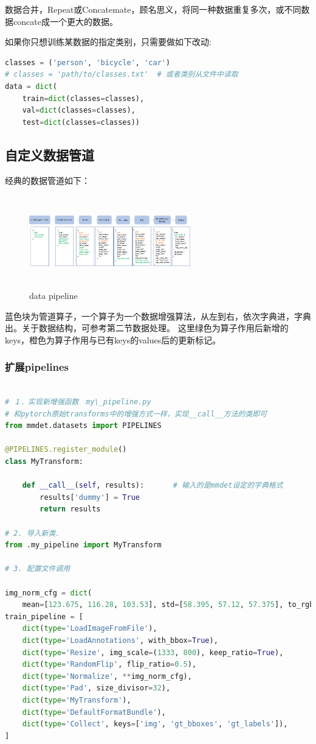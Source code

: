\documentclass[UTF8]{ctexart}
\begin{document}
数据合并，Repeat或Concatemate，顾名思义，将同一种数据重复多次，或不同数据concate成一个更大的数据。

如果你只想训练某数据的指定类别，只需要做如下改动:

\lstset{style=mystyle}
\begin{lstlisting}[language=Python]
classes = ('person', 'bicycle', 'car')
# classes = 'path/to/classes.txt'  # 或者类别从文件中读取
data = dict(
	train=dict(classes=classes),
	val=dict(classes=classes),
	test=dict(classes=classes))
\end{lstlisting}


\subsection{自定义数据管道}

经典的数据管道如下：
\begin{figure}[htbp]
	\centering
	\includegraphics[width=7cm, height=4cm]{./pic/data_pipeline.png}
	\caption{ data pipeline }
\end{figure}

蓝色块为管道算子，一个算子为一个数据增强算法，从左到右，依次字典进，字典出。关于数据结构，可参考第二节数据处理。
这里绿色为算子作用后新增的keys，橙色为算子作用与已有keys的values后的更新标记。


\subsubsection{扩展pipelines}

\lstset{style=mystyle}
\begin{lstlisting}[language=Python]

# １．实现新增强函数　my\_pipeline.py
# 和pytorch原始transforms中的增强方式一样，实现__call__方法的类即可
from mmdet.datasets import PIPELINES

@PIPELINES.register_module()
class MyTransform:

    def __call__(self, results):　　　　# 输入的是mmdet设定的字典格式
        results['dummy'] = True
		return results
		
# 2. 导入新类.
from .my_pipeline import MyTransform

# 3. 配置文件调用

img_norm_cfg = dict(
    mean=[123.675, 116.28, 103.53], std=[58.395, 57.12, 57.375], to_rgb=True)
train_pipeline = [
    dict(type='LoadImageFromFile'),
    dict(type='LoadAnnotations', with_bbox=True),
    dict(type='Resize', img_scale=(1333, 800), keep_ratio=True),
    dict(type='RandomFlip', flip_ratio=0.5),
    dict(type='Normalize', **img_norm_cfg),
    dict(type='Pad', size_divisor=32),
    dict(type='MyTransform'),
    dict(type='DefaultFormatBundle'),
    dict(type='Collect', keys=['img', 'gt_bboxes', 'gt_labels']),
]
\end{lstlisting}
\end{document}
